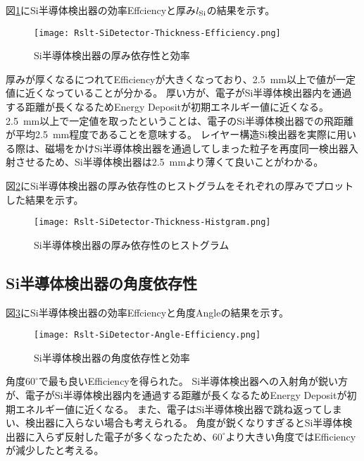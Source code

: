 \documentclass[a4paper,10pt]{jreport}
\begin{document}
図\ref{Rslt-SiDetector-Thickness-Efficiency}にSi半導体検出器の効率Effciencyと厚み$l_{\rm{Si}}$の結果を示す。

\begin{figure}[H]
	\center
	\texttt{[image: Rslt-SiDetector-Thickness-Efficiency.png]}
	\caption{Si半導体検出器の厚み依存性と効率} \label{Rslt-SiDetector-Thickness-Efficiency}
\end{figure}

厚みが厚くなるにつれてEfficiencyが大きくなっており、\SI{2.5}{mm}以上で値が一定値に近くなっていることが分かる。
厚い方が、電子がSi半導体検出器内を通過する距離が長くなるためEnergy Depositが初期エネルギー値に近くなる。
\SI{2.5}{mm}以上で一定値を取ったということは、電子のSi半導体検出器での飛距離が平均\SI{2.5}{mm}程度であることを意味する。
レイヤー構造Si検出器を実際に用いる際は、磁場をかけSi半導体検出器を通過してしまった粒子を再度同一検出器入射させるため、Si半導体検出器は\SI{2.5}{mm}より薄くて良いことがわかる。

図\ref{Rslt-SiDetector-Thickness-Histgram}にSi半導体検出器の厚み依存性のヒストグラムをそれぞれの厚みでプロットした結果を示す。

\begin{figure}[H]
	\center
	\texttt{[image: Rslt-SiDetector-Thickness-Histgram.png]}
	\caption{Si半導体検出器の厚み依存性のヒストグラム} \label{Rslt-SiDetector-Thickness-Histgram}
\end{figure}



\subsection{Si半導体検出器の角度依存性}

図\ref{Rslt-SiDetector-Angle-Efficiency}にSi半導体検出器の効率Effciencyと角度Angleの結果を示す。
	
\begin{figure}[H]
	\center
	\texttt{[image: Rslt-SiDetector-Angle-Efficiency.png]}
	\caption{Si半導体検出器の角度依存性と効率} \label{Rslt-SiDetector-Angle-Efficiency}
\end{figure}

角度$60^{\circ}$で最も良いEfficiencyを得られた。
Si半導体検出器への入射角が鋭い方が、電子がSi半導体検出器内を通過する距離が長くなるためEnergy Depositが初期エネルギー値に近くなる。
また、電子はSi半導体検出器で跳ね返ってしまい、検出器に入らない場合も考えられる。
角度が鋭くなりすぎるとSi半導体検出器に入らず反射した電子が多くなったため、$60^{\circ}$より大きい角度ではEfficiencyが減少したと考える。
\end{document}
